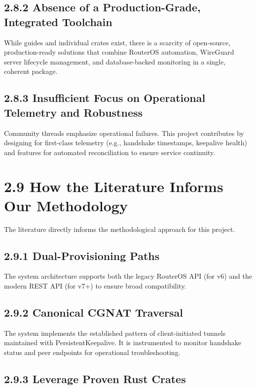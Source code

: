 \documentclass[12pt,a4paper,oneside]{report}
\begin{document}
\subsection{2.8.2 Absence of a Production-Grade, Integrated Toolchain}

While guides and individual crates exist, there is a scarcity of open-source, production-ready solutions that combine RouterOS automation, WireGuard server lifecycle management, and database-backed monitoring in a single, coherent package.

\subsection{2.8.3 Insufficient Focus on Operational Telemetry and Robustness}

Community threads emphasize operational failures. This project contributes by designing for first-class telemetry (e.g., handshake timestamps, keepalive health) and features for automated reconciliation to ensure service continuity.

\section{2.9 How the Literature Informs Our Methodology}

The literature directly informs the methodological approach for this project.

\subsection{2.9.1 Dual-Provisioning Paths}

The system architecture supports both the legacy RouterOS API (for v6) and the modern REST API (for v7+) to ensure broad compatibility.

\subsection{2.9.2 Canonical CGNAT Traversal}

The system implements the established pattern of client-initiated tunnels maintained with PersistentKeepalive. It is instrumented to monitor handshake status and peer endpoints for operational troubleshooting.

\subsection{2.9.3 Leverage Proven Rust Crates}
\end{document}

